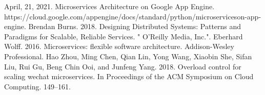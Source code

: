 \documentclass[conference]{IEEEtran}
\begin{document}
\begin{thebibliography}{00}
     \sloppy  April, 21, 2021. Microservices Architecture on Google App Engine. https://cloud.google.com/appengine/docs/standard/python/microserviceson-app-engine.
     Brendan Burns. 2018. Designing Distributed Systems: Patterns and Paradigms for Scalable, Reliable Services. " O’Reilly Media, Inc.".
     Eberhard Wolff. 2016. Microservices: flexible software architecture. Addison-Wesley Professional.
     Hao Zhou, Ming Chen, Qian Lin, Yong Wang, Xiaobin She, Sifan Liu, Rui Gu, Beng Chin Ooi, and Junfeng Yang. 2018. Overload control for scaling wechat microservices. In Proceedings of the ACM Symposium on Cloud Computing. 149–161.




    



\end{thebibliography}
\end{document}
